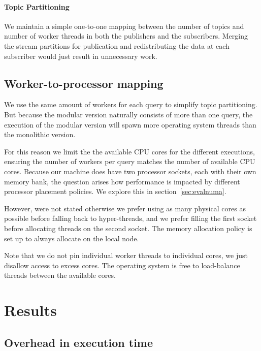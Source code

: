 \paragraph{Topic Partitioning}

We maintain a simple one-to-one mapping between the number of topics and
number of worker threads in both the publishers and the subscribers.
Merging the stream partitions for publication and redistributing
the data at each subscriber would just result in unnecessary work.

\subsection{Worker-to-processor mapping}

We use the same amount of workers for each query to simplify topic partitioning.
But because the modular version naturally consists of more than one query,
the execution of the modular version will spawn more operating system threads
than the monolithic version.

For this reason we limit the the available CPU cores for the different executions,
ensuring the number of workers per query matches the number of available CPU cores.
Because our machine does have two processor sockets, each with their own memory bank,
the question arises how performance is impacted by different processor placement
policies. We explore this in section~\ref{sec:evalnuma}.

However, were not stated otherwise we prefer using as many physical cores 
as possible before falling back to hyper-threads, and we prefer filling the
first socket before allocating threads on the second socket. The memory
allocation policy is set up to always allocate on the local node.

Note that we do not pin individual worker threads to individual cores, we just
disallow access to excess cores. The operating system is free to load-balance
threads between the available cores.

\clearpage

\section{Results}

\subsection{Overhead in execution time}

